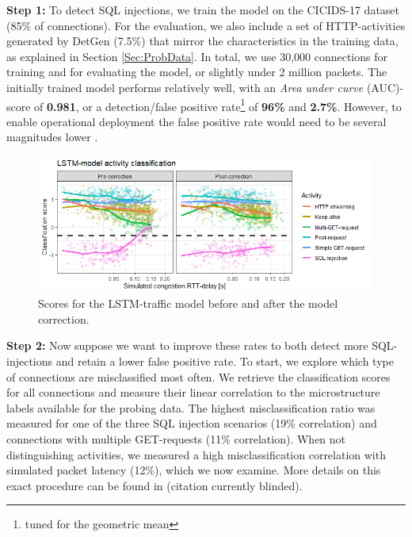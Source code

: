 \documentclass[runningheads]{llncs}
\begin{document}

\textbf{Step 1:} To detect SQL injections, we train the model on the CICIDS-17 dataset \cite{sharafaldin2018toward} (85\% of connections).
For the evaluation, we also include a set of HTTP-activities generated by DetGen (7.5\%) that mirror the characteristics in the training data, as explained in Section \ref{Sec:ProbData}. %
In total, we use 30,000 connections for training and for evaluating the model, or slightly under 2 million packets.
The initially trained model performs relatively well, with an \textit{Area under curve} (AUC)-score %
 of \textbf{0.981}, or a detection/false positive rate\footnote{tuned for the geometric mean} of \textbf{96\%} and \textbf{2.7\%}. However, to enable operational deployment the false positive rate would need to be several magnitudes lower \cite{mell2003overview}. 


\begin{figure}
\centering
\includegraphics[width=0.99\textwidth]{images/LSTM_classi.png}
\caption{Scores for the LSTM-traffic model before and after the model correction.}\label{fig:LSTM_exp}
\end{figure}


\textbf{Step 2:} Now suppose we want to improve these rates to both detect more SQL-injections and retain a lower false positive rate. To start, we explore which type of connections are misclassified most often. We retrieve the classification scores for all connections and measure their linear correlation to the microstructure labels available for the probing data. The highest misclassification ratio was measured for one of the three SQL injection scenarios (19\% correlation) and connections with multiple GET-requests (11\% correlation). When not distinguishing activities, we measured a high misclassification correlation with simulated packet latency (12\%), which we now examine. More details on this exact procedure can be found in (citation currently blinded).
\end{document}
